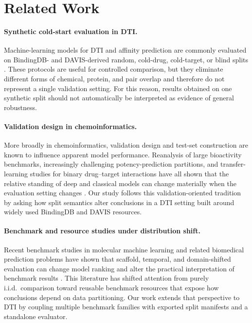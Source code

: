 \section{Related Work}

\paragraph{Synthetic cold-start evaluation in DTI.}
Machine-learning models for DTI and affinity prediction are commonly evaluated on BindingDB- and DAVIS-derived random, cold-drug, cold-target, or blind splits \citep{liu2007bindingdb,davis2011kinase,ahmed2024dtilm,luo2024druglamp,ouyang2024pmmr,liu2025spdti,yu2025gsdti,zhao2025coldstartcpi}. These protocols are useful for controlled comparison, but they eliminate different forms of chemical, protein, and pair overlap and therefore do not represent a single validation setting. For this reason, results obtained on one synthetic split should not automatically be interpreted as evidence of general robustness.

\paragraph{Validation design in chemoinformatics.}
More broadly in chemoinformatics, validation design and test-set construction are known to influence apparent model performance. Reanalysis of large bioactivity benchmarks, increasingly challenging potency-prediction partitions, and transfer-learning studies for binary drug--target interactions have all shown that the relative standing of deep and classical models can change materially when the evaluation setting changes \citep{robinson2020validating,rodriguezperez2021evaluation,tanoori2021binding}. Our study follows this validation-oriented tradition by asking how split semantics alter conclusions in a DTI setting built around widely used BindingDB and DAVIS resources.

\paragraph{Benchmark and resource studies under distribution shift.}
Recent benchmark studies in molecular machine learning and related biomedical prediction problems have shown that scaffold, temporal, and domain-shifted evaluation can change model ranking and alter the practical interpretation of benchmark results \citep{ektefaie2024generalizability,shen2025ddiben,delafuente2025inductive}. This literature has shifted attention from purely i.i.d.\ comparison toward reusable benchmark resources that expose how conclusions depend on data partitioning. Our work extends that perspective to DTI by coupling multiple benchmark families with exported split manifests and a standalone evaluator.

